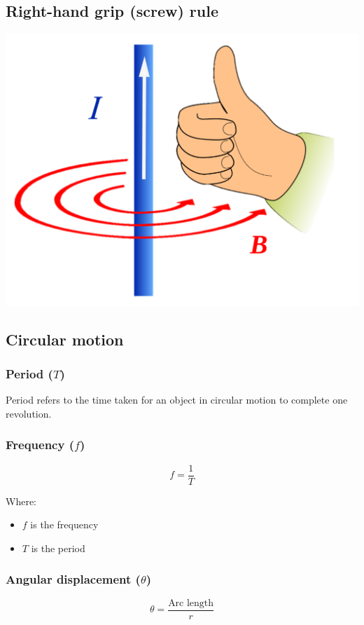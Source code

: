 \documentclass[11pt]{article}
\begin{document}
\subsection{Right-hand grip (screw) rule}
\label{sec:org5b19a18}
\begin{center}
\includegraphics[width=.9\linewidth]{./images/right-hand-grip-rule.png}
\end{center}
\subsection{Circular motion}
\label{sec:orgef4a09f}

\subsubsection{Period (\(T\))}
\label{sec:orgf379def}
Period refers to the time taken for an object in circular motion to complete one revolution.
\subsubsection{Frequency (\(f\))}
\label{sec:org5e6bdda}
\[f = \frac{1}{T}\]

Where:
\begin{itemize}
\item \(f\) is the frequency
\item \(T\) is the period
\end{itemize}

 \newpage
\subsubsection{Angular displacement (\(\theta\))}
\label{sec:orgb5f417b}
\[\theta = \frac{\text{Arc length}}{r}\]
\end{document}
